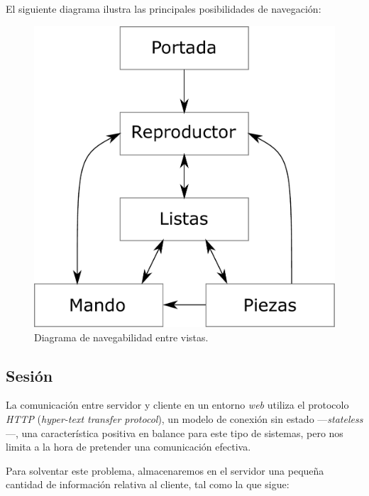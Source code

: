 El siguiente diagrama ilustra las principales posibilidades de navegación:

\smallskip

\begin{figure}[H]
	\noindent \begin{centering}
		\includegraphics[width=\linewidth/2]{capitulo4/navegacion}
		\par\end{centering}
	\smallskip
	\caption{\label{fig:navegacion} Diagrama de navegabilidad entre vistas.}
\end{figure} 

\smallskip

\subsection{Sesión}

La comunicación entre servidor y cliente en un entorno \textit{web} utiliza el protocolo \textit{HTTP} (\textit{hyper-text transfer protocol}), un modelo de conexión sin estado ---\textit{stateless}---, una característica positiva en balance para este tipo de sistemas, pero nos limita a la hora de pretender una comunicación efectiva.

Para solventar este problema, almacenaremos en el servidor una pequeña cantidad de información relativa al cliente, tal como la que sigue:

